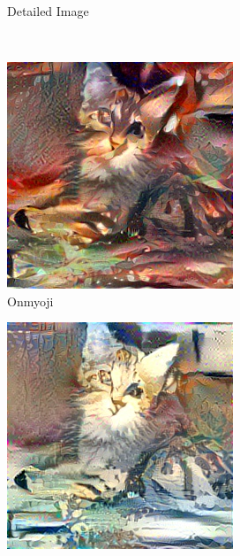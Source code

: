 \documentclass[10pt,twocolumn,letterpaper]{article}
\begin{document}
\begin{figure}
\begin{subfigure}[b]{0.18\textwidth}
    \caption{Detailed Image}
    \label{fig::base41}
  \end{subfigure}
  ~
  \begin{subfigure}[b]{0.18\textwidth}
    \includegraphics[width=\textwidth]{figure/baseline1/yys.jpg}
    \caption{Onmyoji}
    \label{fig::base42}
  \end{subfigure}
  \begin{subfigure}[b]{0.18\textwidth}
    \includegraphics[width=\textwidth]{figure/baseline1/fsh.jpg}

\end{subfigure}
\end{figure}
\end{document}
